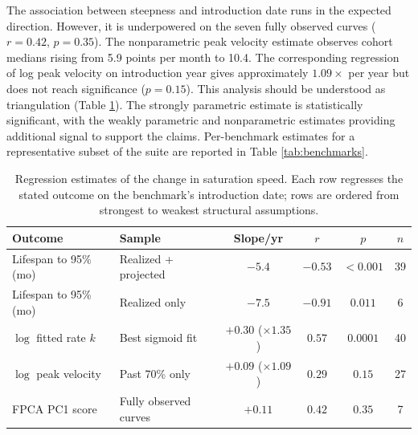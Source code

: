 
The association between steepness and introduction date runs in the expected direction. However, it is underpowered on the seven fully observed curves ($r = 0.42$, $p = 0.35$). The nonparametric peak velocity estimate observes cohort medians rising from 5.9 points per month to 10.4. The corresponding regression of log peak velocity on introduction year gives approximately $1.09\times$ per year but does not reach significance ($p = 0.15$). This analysis should be understood as triangulation (Table \ref{tab:regressions}). The strongly parametric estimate is statistically significant, with the weakly parametric and nonparametric estimates providing additional signal to support the claims. Per-benchmark estimates for a representative subset of the suite are reported in Table \ref{tab:benchmarks}.

\begin{table}[t]
\centering
\caption{Regression estimates of the change in saturation speed. Each row regresses the stated outcome on the benchmark's introduction date; rows are ordered from strongest to weakest structural assumptions.}
\label{tab:regressions}
\begin{tabular}{llcccc}
\toprule
Outcome & Sample & Slope/yr & $r$ & $p$ & $n$ \\
\midrule
Lifespan to 95\% (mo) & Realized + projected      & $-5.4$ & $-0.53$ & $<0.001$ & 39 \\
Lifespan to 95\% (mo) & Realized only             & $-7.5$ & $-0.91$ & $0.011$  & 6  \\
$\log$ fitted rate $k$ & Best sigmoid fit          & $+0.30$ ($\times1.35$) & $0.57$ & $0.0001$ & 40 \\
$\log$ peak velocity   & Past 70\% only            & $+0.09$ ($\times1.09$) & $0.29$ & $0.15$   & 27 \\
FPCA PC1 score         & Fully observed curves     & $+0.11$ & $0.42$ & $0.35$ & 7 \\
\bottomrule
\end{tabular}
\end{table}

